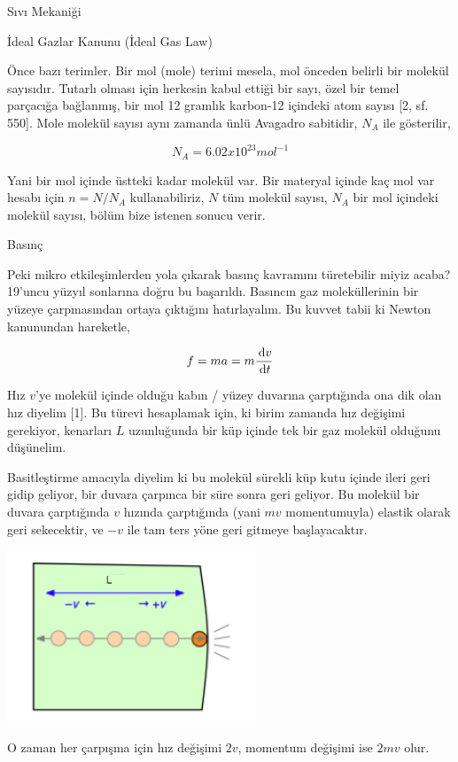 \documentclass[12pt,fleqn]{article}\usepackage{../../common}
\begin{document}
Sıvı Mekaniği

İdeal Gazlar Kanunu (İdeal Gas Law)

Önce bazı terimler. Bir mol (mole) terimi mesela, mol önceden belirli bir
molekül sayısıdır. Tutarlı olması için herkesin kabul ettiği bir sayı, özel bir
temel parçacığa bağlanmış, bir mol 12 gramlık karbon-12 içindeki atom sayısı
[2, sf. 550]. Mole molekül sayısı aynı zamanda ünlü Avagadro sabitidir,
$N_A$ ile gösterilir,

$$
N_A = 6.02 x 10^{23} mol^{-1}
$$

Yani bir mol içinde üstteki kadar molekül var. Bir materyal içinde kaç mol var
hesabı için $n = N / N_A$ kullanabiliriz, $N$ tüm molekül sayısı, $N_A$ bir mol
içindeki molekül sayısı, bölüm bize istenen sonucu verir.

Basınç

Peki mikro etkileşimlerden yola çıkarak basınç kavramını türetebilir miyiz
acaba? 19'uncu yüzyıl sonlarına doğru bu başarıldı. Basıncın gaz moleküllerinin
bir yüzeye çarpmasından ortaya çıktığını hatırlayalım. Bu kuvvet tabii ki Newton
kanunundan hareketle,

$$
f = m a = m \frac{\,\mathrm{d} v}{\,\mathrm{d} t}
$$

Hız $v$'ye molekül içinde olduğu kabın / yüzey duvarına çarptığında ona dik olan
hız diyelim [1]. Bu türevi hesaplamak için, ki birim zamanda hız değişimi
gerekiyor, kenarları $L$ uzunluğunda bir küp içinde tek bir gaz molekül olduğunu
düşünelim.

Basitleştirme amacıyla diyelim ki bu molekül sürekli küp kutu içinde ileri geri
gidip geliyor, bir duvara çarpınca bir süre sonra geri geliyor. Bu molekül bir
duvara çarptığında $v$ hızında çarptığında (yani $mv$ momentumuyla) elastik
olarak geri sekecektir, ve $-v$ ile tam ters yöne geri gitmeye başlayacaktır.

\includegraphics[width=20em]{phy_005_basics_04.png}

O zaman her çarpışma için hız değişimi $2v$, momentum değişimi ise $2mv$
olur.
\end{document}
